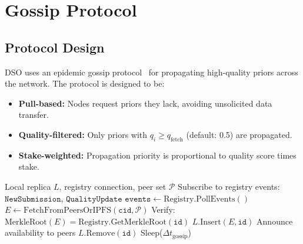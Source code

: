 \section{Gossip Protocol}

\label{sec:gossip}

\subsection{Protocol Design}

DSO uses an epidemic gossip protocol~\cite{demers1987epidemic} for propagating
high-quality priors across the network. The protocol is designed to be:
\begin{itemize}[leftmargin=1.5em]
    \item \textbf{Pull-based:} Nodes request priors they lack, avoiding
          unsolicited data transfer.
    \item \textbf{Quality-filtered:} Only priors with $q_i \geq q_{\text{fetch}}$
          (default: 0.5) are propagated.
    \item \textbf{Stake-weighted:} Propagation priority is proportional to
          quality score times stake.
\end{itemize}

\begin{algorithm}[H]
\caption{DSO Gossip Protocol (per node)}
\label{alg:gossip}
\begin{algorithmic}[1]
\Require Local replica $L$, registry connection, peer set $\mathcal{P}$
\State Subscribe to registry events: $\texttt{NewSubmission}$, $\texttt{QualityUpdate}$
\Loop
    \State $\texttt{events} \gets \text{Registry.PollEvents}()$
            \State $E \gets \text{FetchFromPeersOrIPFS}(\texttt{cid}, \mathcal{P})$
            \State Verify: $\text{MerkleRoot}(E) = \text{Registry.GetMerkleRoot}(\texttt{id})$
                \State $L.\text{Insert}(E, \texttt{id})$
                \State Announce availability to peers
            \EndIf
        \EndIf
    \EndFor
            \State $L.\text{Remove}(\texttt{id})$
        \EndIf
    \EndFor
    \State Sleep($\Delta t_{\text{gossip}}$)
\EndLoop
\end{algorithmic}
\end{algorithm}

